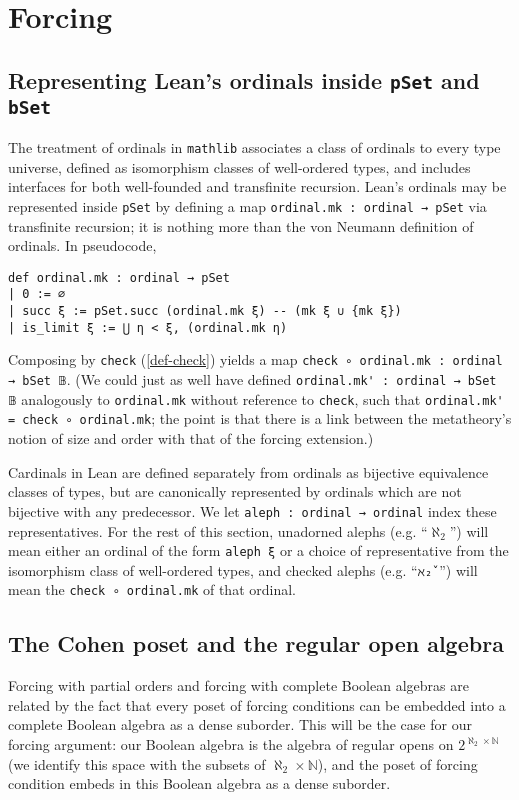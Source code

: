 \documentclass[a4paper,USenglish,cleveref, autoref]{lipics-v2019}
\newcommand{\B}{\mathbb{B}}
\newcommand{\lil}{\lstinline}
\theoremstyle{theorem}
\theoremstyle{definition}
\begin{document}
\section{Forcing}
\label{sect:forcing}

\subsection{Representing Lean's ordinals inside \lil{pSet} and \lil{bSet}}
The treatment of ordinals in \lil{mathlib} associates a class of ordinals to every type universe, defined as isomorphism classes of well-ordered types, and includes interfaces for both well-founded and transfinite recursion. Lean's ordinals may be represented inside \lil{pSet} by defining a map \lil{ordinal.mk : ordinal → pSet} via transfinite recursion; it is nothing more than the von Neumann definition of ordinals. In pseudocode,
\begin{lstlisting}
def ordinal.mk : ordinal → pSet
| 0 := ∅
| succ ξ := pSet.succ (ordinal.mk ξ) -- (mk ξ ∪ {mk ξ})
| is_limit ξ := ⋃ η < ξ, (ordinal.mk η)
\end{lstlisting}
Composing by \lil{check} (\autoref{def-check}) yields a map \lil{check ∘ ordinal.mk : ordinal → bSet 𝔹}. (We could just as well have defined \lstinline{ordinal.mk' : ordinal → bSet 𝔹} analogously to \lstinline{ordinal.mk} without reference to \lil{check}, such that \lstinline{ordinal.mk' = check ∘ ordinal.mk}; the point is that there is a link between the metatheory's notion of size and order with that of the forcing extension.)

Cardinals in Lean are defined separately from ordinals as bijective equivalence classes of types, but are canonically represented by ordinals which are not bijective with any predecessor. We let \lil{aleph : ordinal → ordinal} index these representatives. For the rest of this section, unadorned alephs (e.g. ``$\aleph_2$'') will mean either an ordinal of the form \lil{aleph ξ} or a choice of representative from the isomorphism class of well-ordered types, and checked alephs (e.g. ``\lil{ℵ₂̌ }'') will mean the \lil{check ∘ ordinal.mk} of that ordinal.

\subsection{The Cohen poset and the regular open algebra}
Forcing with partial orders and forcing with complete Boolean algebras are related by the fact that every poset of forcing conditions can be embedded into a complete Boolean algebra as a dense suborder. This will be the case for our forcing argument: our Boolean algebra is the algebra of regular opens on $2^{\aleph_2 \times \mathbb{N}}$ (we identify this space with the subsets of $\aleph_2 \times \mathbb{N}$), and the poset of forcing condition embeds in this Boolean algebra as a dense suborder.
\end{document}
